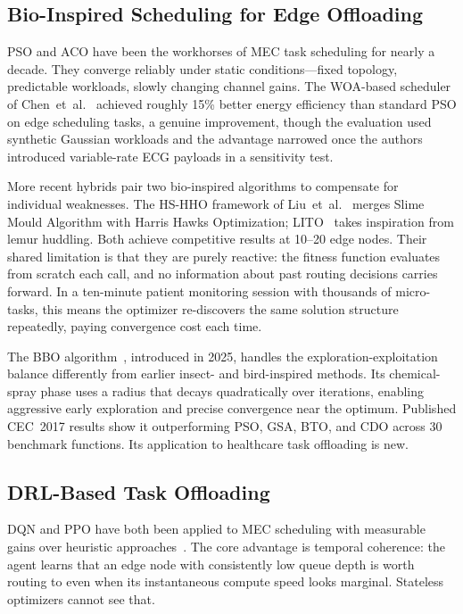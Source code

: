 \documentclass[journal]{IEEEtran}
\begin{document}
\subsection{Bio-Inspired Scheduling for Edge Offloading}

PSO and ACO have been the workhorses of MEC task scheduling for nearly
a decade. They converge reliably under static conditions---fixed
topology, predictable workloads, slowly changing channel gains. The
WOA-based scheduler of Chen~et~al.~\cite{chen2022woa} achieved roughly
15\% better energy efficiency than standard PSO on edge scheduling
tasks, a genuine improvement, though the evaluation used synthetic
Gaussian workloads and the advantage narrowed once the authors
introduced variable-rate ECG payloads in a sensitivity test.

More recent hybrids pair two bio-inspired algorithms to compensate for
individual weaknesses. The HS-HHO framework of Liu~et~al.~\cite{liu2023hshho}
merges Slime Mould Algorithm with Harris Hawks Optimization; LITO~\cite{kaveh2024lito}
takes inspiration from lemur huddling. Both achieve competitive results
at 10--20 edge nodes. Their shared limitation is that they are purely
reactive: the fitness function evaluates from scratch each call, and no
information about past routing decisions carries forward. In a ten-minute
patient monitoring session with thousands of micro-tasks, this means the
optimizer re-discovers the same solution structure repeatedly, paying
convergence cost each time.

The BBO algorithm~\cite{bbo2025}, introduced in 2025, handles the
exploration-exploitation balance differently from earlier insect- and
bird-inspired methods. Its chemical-spray phase uses a radius that
decays quadratically over iterations, enabling aggressive early
exploration and precise convergence near the optimum. Published
CEC~2017 results show it outperforming PSO, GSA, BTO, and CDO across
30 benchmark functions. Its application to healthcare task offloading
is new.

\subsection{DRL-Based Task Offloading}

DQN and PPO have both been applied to MEC scheduling with measurable
gains over heuristic approaches~\cite{he2021drl}. The core advantage
is temporal coherence: the agent learns that an edge node with
consistently low queue depth is worth routing to even when its
instantaneous compute speed looks marginal. Stateless optimizers cannot
see that.
\end{document}

